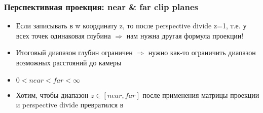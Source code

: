 \documentclass{beamer}
\begin{document}
\begin{frame}[fragile]
\frametitle{Перспективная проекция: near \& far clip planes}
\begin{itemize}
\item Если записывать в w координату z, то после perspective divide z=1, т.е. у всех точек одинаковая глубина \begin{math}\Rightarrow\end{math} нам нужна другая формула проекции!
\pause
\item Итоговый диапазон глубин ограничен \begin{math}\Rightarrow\end{math} нужно как-то ограничить диапазон возможных расстояний до камеры
\pause
\item \begin{math}0 < near < far < \infty\end{math}
\pause
\item Хотим, чтобы диапазон \begin{math}z\in [near,far]\end{math} после применения матрицы проекции и perspective divide превратился в \begin{math}[-1,1]\end{math}
\end{itemize}
\end{frame}
\end{document}
